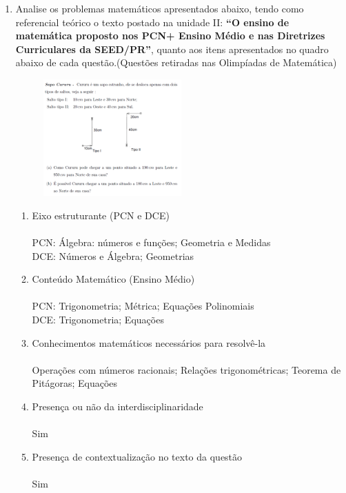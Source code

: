 \documentclass[a4paper, 12pt]{article}
\begin{document}
\begin{enumerate}
\item Analise os problemas matemáticos apresentados abaixo, tendo como referencial teórico o texto postado na unidade II: \textbf{“O ensino de matemática proposto nos PCN+ Ensino Médio e nas Diretrizes Curriculares da SEED/PR”}, quanto aos itens apresentados no quadro abaixo de cada questão.(Questões retiradas nas Olimpíadas de Matemática)
\begin{figure}[h!]
  \centering
  \includegraphics[width=0.5\textwidth]{1}
\end{figure} 
  \begin{enumerate}
  \item Eixo estruturante (PCN e DCE)\\\\
    PCN: Álgebra: números e funções; Geometria e Medidas\\
    DCE: Números e Álgebra; Geometrias
  \item Conteúdo Matemático (Ensino Médio) \\\\
    PCN: Trigonometria; Métrica; Equações Polinomiais\\
    DCE: Trigonometria; Equações
  \item Conhecimentos matemáticos necessários para resolvê-la \\\\
    Operações com números racionais; Relações trigonométricas; Teorema de Pitágoras; Equações
  \item Presença ou não da interdisciplinaridade \\\\
    Sim
  \item Presença de contextualização no texto da questão\\\\
    Sim
  \end{enumerate}
\newpage
\begin{figure}[h!]

\end{figure}
\end{enumerate}
\end{document}
